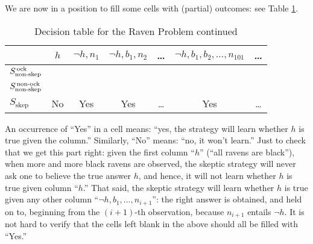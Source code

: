 We are now in a position to fill some cells with (partial) outcomes: see Table \ref{lin-table2}.
\begin{table}[ht]
\centering
\begin{tabular}{lcccccc}
	& $h$ & $\neg h, n_1$ & $\neg h, b_1, n_2$ & \ldots & $\neg h, b_1, b_2, \ldots, n_{101}$ & \ldots \\
	\hline\hline
  	$S_{\textrm{non-skep}}^{\textrm{\,ock}}$ &&&&&& \\
  	$S_{\textrm{non-skep}}^{\textrm{\,non-ock}}$ &&&&&& \\
	$S_{\textrm{skep}}$ & No & Yes & Yes & \ldots & Yes & \ldots
\end{tabular}
\caption{Decision table for the Raven Problem continued}\label{lin-table2}
\end{table}
An occurrence of ``Yes'' in a cell means: ``yes, the strategy will learn whether $h$ is true given the column.'' Similarly, ``No'' means: ``no, it won't learn.'' Just to check that we get this part right: given the first column ``$h$'' (``all ravens are black''), when more and more black ravens are observed, the skeptic strategy will never ask one to believe the true answer $h$, and hence, it will not learn whether $h$ is true given column ``$h$.'' That said, the skeptic strategy will learn whether $h$ is true given any other column ``$\neg h, b_1, \ldots, n_{i+1}$'': the right answer is obtained, and held on to, beginning from the $(i+1)$-th observation, because $n_{i+1}$ entails $\neg h$. It is not hard to verify that the cells left blank in the above should all be filled with ``Yes.''

